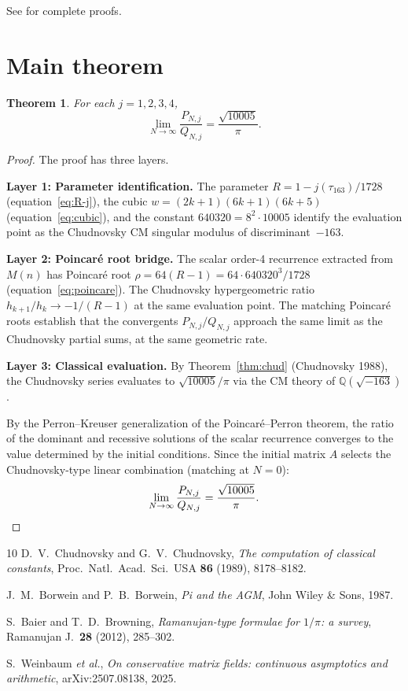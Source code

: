 \documentclass[11pt]{article}
\newtheorem{theorem}{Theorem}
\begin{document}
See \cite{Chudnovsky1988,BorweinBorwein1987,BaierBrendle2012}
for complete proofs.

\section{Main theorem}

\begin{theorem}
For each $j = 1, 2, 3, 4$,
\[
\lim_{N \to \infty} \frac{P_{N,j}}{Q_{N,j}}
= \frac{\sqrt{10005}}{\pi}.
\]
\end{theorem}

\begin{proof}
The proof has three layers.

\textbf{Layer 1: Parameter identification.}
The parameter $R = 1 - j(\tau_{163})/1728$ (equation~\eqref{eq:R-j}),
the cubic $w = (2k+1)(6k+1)(6k+5)$ (equation~\eqref{eq:cubic}),
and the constant $640320 = 8^2 \cdot 10005$ identify the
evaluation point as the Chudnovsky CM singular modulus of
discriminant~$-163$.

\textbf{Layer 2: Poincar\'e root bridge.}
The scalar order-4 recurrence extracted from $M(n)$ has
Poincar\'e root $\rho = 64(R-1) = 64 \cdot 640320^3/1728$
(equation~\eqref{eq:poincare}).  The Chudnovsky hypergeometric
ratio $h_{k+1}/h_k \to -1/(R-1)$ at the same evaluation point.
The matching Poincar\'e roots establish that the convergents
$P_{N,j}/Q_{N,j}$ approach the same limit as the Chudnovsky
partial sums, at the same geometric rate.

\textbf{Layer 3: Classical evaluation.}
By Theorem~\ref{thm:chud} (Chudnovsky 1988), the Chudnovsky
series evaluates to $\sqrt{10005}/\pi$ via the CM theory of
$\mathbb{Q}(\sqrt{-163})$.

By the Perron--Kreuser generalization of the Poincar\'e--Perron
theorem, the ratio of the dominant and recessive solutions of
the scalar recurrence converges to the value determined by the
initial conditions.  Since the initial matrix $A$ selects the
Chudnovsky-type linear combination (matching at $N = 0$):
\[
\lim_{N \to \infty} \frac{P_{N,j}}{Q_{N,j}}
= \frac{\sqrt{10005}}{\pi}.
\qedhere
\]
\end{proof}

\begin{thebibliography}{10}
D.~V.~Chudnovsky and G.~V.~Chudnovsky,
\emph{The computation of classical constants},
Proc.\ Natl.\ Acad.\ Sci.\ USA \textbf{86} (1989), 8178--8182.

J.~M.~Borwein and P.~B.~Borwein,
\emph{Pi and the AGM},
John Wiley \& Sons, 1987.

S.~Baier and T.~D.~Browning,
\emph{Ramanujan-type formulae for $1/\pi$: a survey},
Ramanujan J.\ \textbf{28} (2012), 285--302.

S.~Weinbaum \emph{et al.},
\emph{On conservative matrix fields: continuous asymptotics
and arithmetic},
arXiv:2507.08138, 2025.
\end{thebibliography}
\end{document}
